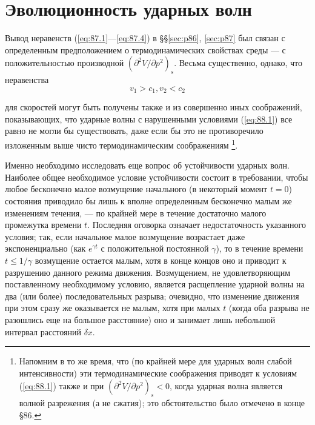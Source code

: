 \section{Эволюционность ударных волн}\label{sec:p88}

Вывод неравенств (\ref{eq:87.1}—\ref{eq:87.4}) в \S\S \ref{sec:p86},
\ref{sec:p87} был связан с определенным предположением о термодинамических
свойствах среды — с положительностью производной $(\partial^2 V/\partial
p^2)_s$.  Весьма существенно, однако, что неравенства
\begin{equation}
	\label{eq:88.1}
	v_1 > c_1, v_2 < c_2
\end{equation}

для скоростей могут быть получены также и из совершенно иных соображений,
показывающих, что ударные волны с нарушенными условиями (\ref{eq:88.1}) все
равно не могли бы существовать, даже если бы это не противоречило изложенным
выше чисто термодинамическим соображениям \footnote{ Напомним в то же время,
что (по крайней мере для ударных волн слабой интенсивности) эти
термодинамические соображения приводят к условиям (\ref{eq:88.1}) также и при
$(\partial ^2 V/\partial p^2)_s < 0$, когда ударная волна является волной
разрежения (а не сжатия); это обстоятельство было отмечено в конце \S 86.}.

Именно необходимо исследовать еще вопрос об устойчивости ударных волн. Наиболее
общее необходимое условие устойчивости состоит в требовании, чтобы любое
бесконечно малое возмущение начального (в некоторый момент $t=0$) состояния
приводило бы лишь к вполне определенным бесконечно малым же изменениям течения,
— по крайней мере в течение достаточно малого промежутка времени $t$. Последняя
оговорка означает недостаточность указанного условия; так, если начальное малое
возмущение возрастает даже экспоненциально (как $e^{\gamma t}$ с положительной постоянной $\gamma$), то в течение времени $t \le 1/\gamma$ возмущение остается малым, хотя в конце концов оно
и приводит к разрушению данного режима движения. Возмущением, не
удовлетворяющим поставленному необходимому условию, является расщепление
ударной волны на два (или более) последовательных разрыва; очевидно, что
изменение движения при этом сразу же оказывается не малым, хотя при малых $t$
(когда оба разрыва не разошлись еще на большое расстояние) оно и занимает лишь
небольшой интервал расстояний $\delta x$.

